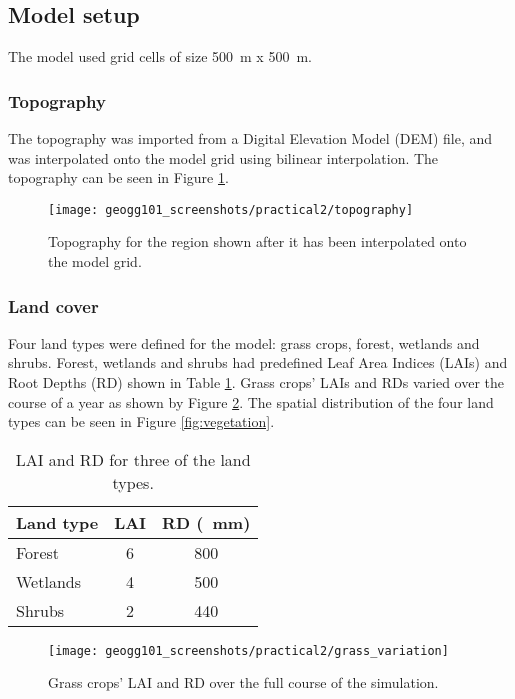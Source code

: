 \documentclass{article}
\begin{document}
\subsection{Model setup}

The model used grid cells of size \SI{500}{m} x \SI{500}{m}.

\subsubsection{Topography}

The topography was imported from a Digital Elevation Model (DEM) file, and was interpolated onto the model grid using bilinear interpolation. The topography can be seen in Figure \ref{fig:topography}.

\begin{figure}[!h]
    \centering
    \texttt{[image: geogg101\_screenshots/practical2/topography]}
    \caption{Topography for the region shown after it has been interpolated onto the model grid.}
    \label{fig:topography}
\end{figure}

\subsubsection{Land cover}

Four land types were defined for the model: grass crops, forest, wetlands and shrubs. Forest, wetlands and shrubs had predefined Leaf Area Indices (LAIs) and Root Depths (RD) shown in Table \ref{table:lai_rd}. Grass crops' LAIs and RDs varied over the course of a year as shown by Figure \ref{fig:grass_variation}. The spatial distribution of the four land types can be seen in Figure \ref{fig:vegetation}.

\setlength\extrarowheight{3pt}
\begin{table}[!h]
    \centering
    \begin{tabular}{l c c}
	Land type   & LAI & RD (\SI{}{mm}) \\
	    \hline
	    Forest & \num{6} & \num{800} \\
	    Wetlands & \num{4} & \num{500} \\
	    Shrubs & \num{2} & \num{440} \\
    \end{tabular}
    \caption{LAI and RD for three of the land types.}
    \label{table:lai_rd}
\end{table}


\begin{figure}[!h]
    \centering
    \texttt{[image: geogg101\_screenshots/practical2/grass\_variation]}
    \caption{Grass crops' LAI and RD over the full course of the simulation.}
    \label{fig:grass_variation}
\end{figure}
\end{document}
